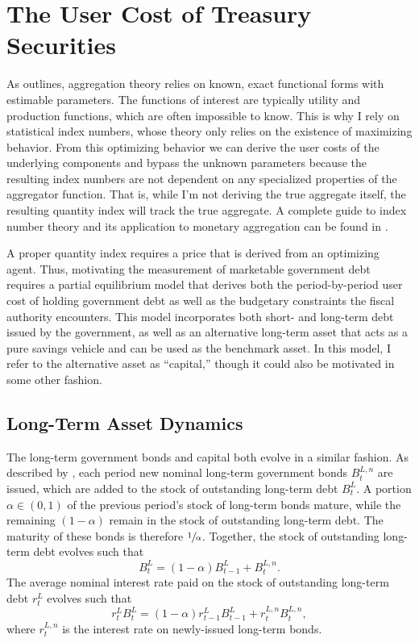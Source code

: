 \documentclass[11pt,a4paper,margin=1.5in]{article}
\begin{document}
\section{The User Cost of Treasury Securities}
\label{sec:Theory}
As \citet{Barnett:1980} outlines, aggregation theory relies on known, exact functional forms with estimable parameters.
The functions of interest are typically utility and production functions, which are often impossible to know.
This is why I rely on statistical index numbers, whose theory only relies on the existence of maximizing behavior.
From this optimizing behavior we can derive the user costs of the underlying components and bypass the unknown parameters because the resulting index numbers are not dependent on any specialized properties of the aggregator function.
That is, while I'm not deriving the true aggregate itself, the resulting quantity index will track the true aggregate.
A complete guide to index number theory and its application to monetary aggregation can be found in \citet{Barnett-Serletis:2000}.

A proper quantity index requires a price that is derived from an optimizing agent.
Thus, motivating the measurement of marketable government debt requires a partial equilibrium model that derives both the period-by-period user cost of holding government debt as well as the budgetary constraints the fiscal authority encounters.
This model incorporates both short- and long-term debt issued by the government, as well as an alternative long-term asset that acts as a pure savings vehicle and can be used as the benchmark asset. 
In this model, I refer to the alternative asset as ``capital,'' though it could also be motivated in some other fashion. 

\subsection{Long-Term Asset Dynamics}
The long-term government bonds and capital both evolve in a similar fashion.
As described by \citet{Krause-Moyen:2016}, each period new nominal long-term government bonds $B^{L,n}_t$ are issued, which are added to the stock of outstanding long-term debt $B^L_t$.
A portion $\alpha \in (0,1)$ of the previous period's stock of long-term bonds mature, while the remaining $(1-\alpha)$ remain in the stock of outstanding long-term debt. 
The maturity of these bonds is therefore $\sfrac{1}{\alpha}$.
Together, the stock of outstanding long-term debt evolves such that 
\begin{equation}
	B^L_t = (1-\alpha)B^L_{t-1} + B^{L,n}_t.
	\label{eq:LoM_DebtLevel}
\end{equation}
The average nominal interest rate paid on the stock of outstanding long-term debt $r^L_t$ evolves such that
\begin{equation}
	r^L_t B^L_t = (1-\alpha)r^L_{t-1}B^L_{t-1} + r^{L,n}_tB^{L,n}_t,
	\label{eq:LoM_DebtReturn}
\end{equation}
where $r^{L,n}_t$ is the interest rate on newly-issued long-term bonds. 
\end{document}
